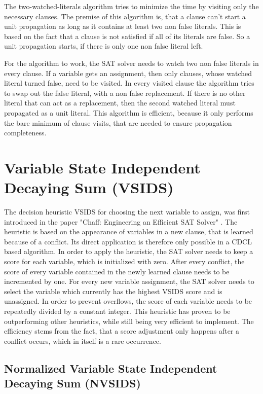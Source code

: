 The two-watched-literals algorithm tries to minimize the time by visiting only the necessary clauses. The premise of this algorithm is, that a clause can't start a unit propagation as long as it contains at least two non false literals. This is based on the fact that a clause is not satisfied if all of its literals are false. So a unit propagation starts, if there is only one non false literal left. \cite{moskewicz2001chaff}

For the algorithm to work, the SAT solver needs to watch two non false literals in every clause. If a variable gets an assignment, then only clauses, whose watched literal turned false, need to be visited. In every visited clause the algorithm tries to swap out the false literal, with a non false replacement. If there is no other literal that can act as a replacement, then the second watched literal must propagated as a unit literal. This algorithm is efficient, because it only performs the bare minimum of clause visits, that are needed to ensure propagation completeness. \cite{moskewicz2001chaff}

\section{Variable State Independent Decaying Sum (VSIDS)}
\label{sec:VSIDS}

The decision heuristic VSIDS for choosing the next variable to assign, was first introduced in the paper "Chaff: Engineering an Efficient SAT Solver" \cite{moskewicz2001chaff}. The heuristic is based on the appearance of variables in a new clause, that is learned because of a conflict. Its direct application is therefore only possible in a CDCL based algorithm. In order to apply the heuristic, the SAT solver needs to keep a score for each variable, which is initialized with zero. After every conflict, the score of every variable contained in the newly learned clause needs to be incremented by one. For every new variable assignment, the SAT solver needs to select the variable which currently has the highest VSIDS score and is unassigned. In order to prevent overflows, the score of each variable needs to be repeatedly divided by a constant integer. This heuristic has proven to be outperforming other heuristics, while still being very efficient to implement. The efficiency stems from the fact, that a score adjustment only happens after a conflict occurs, which in itself is a rare occurrence.

\subsection{Normalized Variable State Independent Decaying Sum (NVSIDS)}
\label{sec:NVSIDS}

